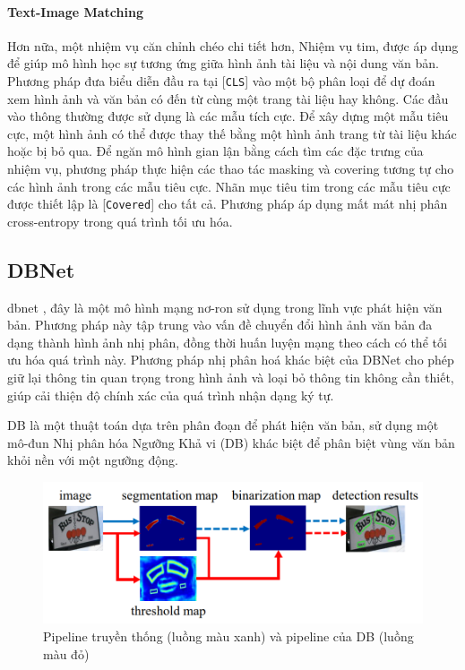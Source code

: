 \paragraph*{Text-Image Matching}
Hơn nữa, một nhiệm vụ căn chỉnh chéo chi tiết hơn, Nhiệm vụ \acrfull*{tim}, được áp dụng để giúp mô hình học sự tương ứng giữa hình ảnh tài liệu và nội dung văn bản. Phương pháp đưa biểu diễn đầu ra tại [\texttt{CLS}] vào một bộ phân loại để dự đoán xem hình ảnh và văn bản có đến từ cùng một trang tài liệu hay không. Các đầu vào thông thường được sử dụng là các mẫu tích cực. Để xây dựng một mẫu tiêu cực, một hình ảnh có thể được thay thế bằng một hình ảnh trang từ tài liệu khác hoặc bị bỏ qua. Để ngăn mô hình gian lận bằng cách tìm các đặc trưng của nhiệm vụ, phương pháp thực hiện các thao tác masking và covering tương tự cho các hình ảnh trong các mẫu tiêu cực. Nhãn mục tiêu \acrshort*{tim} trong các mẫu tiêu cực được thiết lập là [\texttt{Covered}] cho tất cả. Phương pháp áp dụng mất mát nhị phân cross-entropy trong quá trình tối ưu hóa.

\subsection{DBNet} \label{dbnet}
\acrfull*{dbnet} \cite{liao2019realtime}, đây là một mô hình mạng nơ-ron sử dụng trong lĩnh vực phát hiện văn bản. Phương pháp này tập trung vào vấn đề chuyển đổi hình ảnh văn bản đa dạng thành hình ảnh nhị phân, đồng thời huấn luyện mạng theo cách có thể tối ưu hóa quá trình này. Phương pháp nhị phân hoá khác biệt của DBNet cho phép giữ lại thông tin quan trọng trong hình ảnh và loại bỏ thông tin không cần thiết, giúp cải thiện độ chính xác của quá trình nhận dạng ký tự.

DB là một thuật toán dựa trên phân đoạn để phát hiện văn bản, sử dụng một mô-đun Nhị phân hóa Ngưỡng Khả vi (DB) khác biệt để phân biệt vùng văn bản khỏi nền với một ngưỡng động.

\begin{figure}[h]
    \includegraphics[scale=0.5]{chapter2/images/tradition-db-pipeline.png}
    \centering
    \caption{Pipeline truyền thống (luồng màu xanh) và pipeline của DB (luồng màu đỏ) }
    \label{}
\end{figure}

